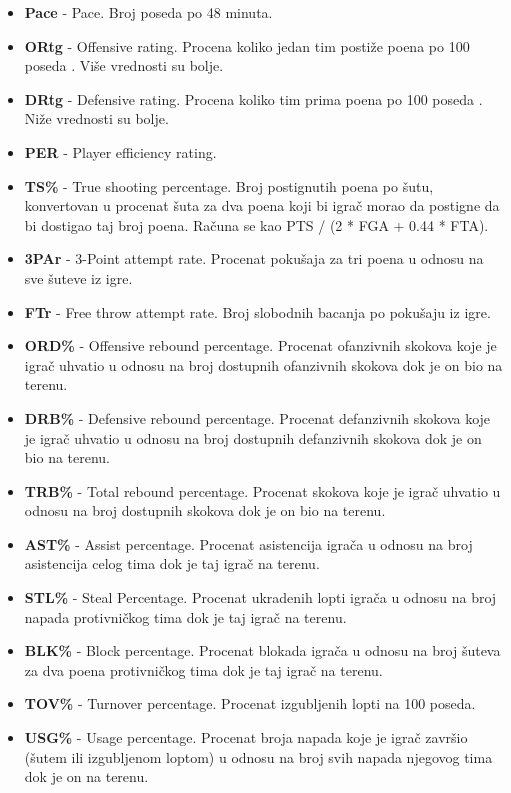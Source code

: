 \documentclass[a4paper]{article}
\begin{document}
\begin{itemize}
	\item \textbf{Pace} - Pace. Broj poseda po 48 minuta.
	\item \textbf{ORtg} - Offensive rating. Procena koliko jedan tim postiže poena po 100 poseda \cite{odrt}. Više vrednosti su bolje.
	\item \textbf{DRtg} - Defensive rating. Procena koliko tim prima poena po 100 poseda \cite{odrt}. Niže vrednosti su bolje.
	\item \textbf{PER} - Player efficiency rating. \cite{per}
	\item \textbf{TS\%} - True shooting percentage. Broj postignutih poena po šutu, konvertovan u procenat šuta za dva poena koji bi igrač morao da postigne da bi dostigao taj broj poena. Računa se kao PTS / (2 * FGA + 0.44 * FTA). 
	\item \textbf{3PAr} - 3-Point attempt rate. Procenat pokušaja za tri poena u odnosu na sve šuteve iz igre.
	\item \textbf{FTr} - Free throw attempt rate. Broj slobodnih bacanja po pokušaju iz igre.
	\item \textbf{ORD\%} - Offensive rebound percentage. Procenat ofanzivnih skokova koje je igrač uhvatio u odnosu na broj dostupnih ofanzivnih skokova dok je on bio na terenu.
	\item \textbf{DRB\%} - Defensive rebound percentage. Procenat defanzivnih skokova koje je igrač uhvatio u odnosu na broj dostupnih defanzivnih skokova dok je on bio na terenu.
	\item \textbf{TRB\%} - Total rebound percentage. Procenat skokova koje je igrač uhvatio u odnosu na broj dostupnih skokova dok je on bio na terenu.
	\item \textbf{AST\%} - Assist percentage. Procenat asistencija igrača u odnosu na broj asistencija celog tima dok je taj igrač na terenu.
	\item \textbf{STL\%} - Steal Percentage. Procenat ukradenih lopti igrača u odnosu na broj napada protivničkog tima dok je taj igrač na terenu.
	\item \textbf{BLK\%} - Block percentage. Procenat blokada igrača u odnosu na broj šuteva za dva poena protivničkog tima dok je taj igrač na terenu.
	\item \textbf{TOV\%} - Turnover percentage. Procenat izgubljenih lopti na 100 poseda.
	\item \textbf{USG\%} - Usage percentage. Procenat broja napada koje je igrač završio (šutem ili izgubljenom loptom) u odnosu na broj svih napada njegovog tima dok je on na terenu.

\end{itemize}
\end{document}
